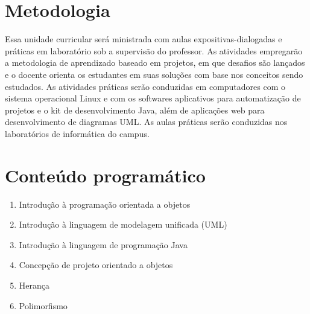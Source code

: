 \documentclass[11pt]{ifscarticle}
\begin{document}
\section{Metodologia}

Essa unidade curricular será ministrada com aulas expositivas-dialogadas e práticas em laboratório sob a supervisão do professor. As atividades empregarão a metodologia de aprendizado baseado em projetos, em que desafios são lançados e o docente orienta os estudantes em suas soluções com base nos conceitos sendo estudados. As atividades práticas serão conduzidas em computadores com o sistema operacional Linux e com os softwares aplicativos para automatização de projetos e o kit de desenvolvimento Java, além de aplicações web para desenvolvimento de diagramas UML. As aulas práticas serão conduzidas nos laboratórios de informática do campus.

\section{Conteúdo programático}

\begin{enumerate}
	\item Introdução à programação orientada a objetos
	\item Introdução à linguagem de modelagem unificada (UML)
	\item Introdução à linguagem de programação Java
	\item Concepção de projeto orientado a objetos
	\item Herança
	\item Polimorfismo
\end{enumerate}


\nocite{*}

\printbibliography[heading=bibintoc,keyword={basica},title={Bibliografia básica}]%

\printbibliography[heading=bibintoc,keyword={complementar},title={Bibliografia complementar}]%
\end{document}
